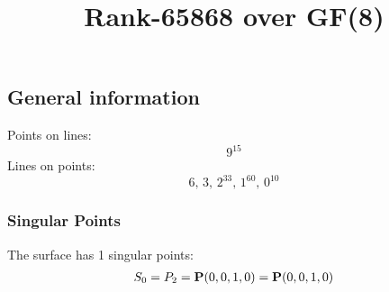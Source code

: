 \documentclass{article}
\newcommand\setTBstruts{\def\T{\rule{0pt}{2.6ex}}%
\def\B{\rule[-1.2ex]{0pt}{0pt}}}
\newcommand{\bP}{{\bf P}}
\begin{document}
 
\setTBstruts



{\allowdisplaybreaks%






\title{Rank-65868 over GF(8)}
\author{}%
\maketitle%
%
{}



\subsection*{General information}
Points on lines:
$$
9^{15}$$
Lines on points:
$$
6,\,3,\,2^{33},\,1^{60},\,0^{10}$$
\subsubsection*{Singular Points}
The surface has 1 singular points:\\
\begin{align*}
S_{0} &= P_{2}=\bP(0, 0, 1, 0) = \bP(0, 0, 1, 0)\\
\end{align*}
}
\end{document}
